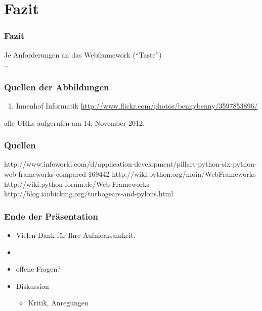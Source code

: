 \documentclass[
    t,
    smaller,
    compress,
]{beamer}
\begin{document}
\section{Fazit}
\begin{frame}
  \frametitle{Fazit}

  Je Anforderungen an das Webframework (“Taste”)\\
  \dots
\end{frame}


\begin{frame}
  \frametitle{Quellen der Abbildungen}
  \footnotesize
  \begin{enumerate}[<1->]
    \item Innenhof Informatik
        \url{http://www.flickr.com/photos/bennybenny/3597853896/} \label{illu:1}
  \end{enumerate}
  alle URLs aufgerufen am 14. November 2012.
\end{frame}


\begin{frame}
  \frametitle{Quellen}
http://www.infoworld.com/d/application-development/pillars-python-six-python-web-frameworks-compared-169442
http://wiki.python.org/moin/WebFrameworks
http://wiki.python-forum.de/Web-Frameworks
http://blog.ianbicking.org/turbogears-and-pylons.html
\end{frame}


\begin{frame}
    \frametitle{Ende der Präsentation}
    \LARGE
    \begin{itemize}[<1->]
        \item Vielen Dank für Ihre Aufmerksamkeit.
        \item
        \item offene Fragen?
        \item Diskussion
        \begin{itemize}[<1->]
          \Large
          \item Kritik, Anregungen
        \end{itemize}
    \end{itemize}
\end{frame}
\end{document}
